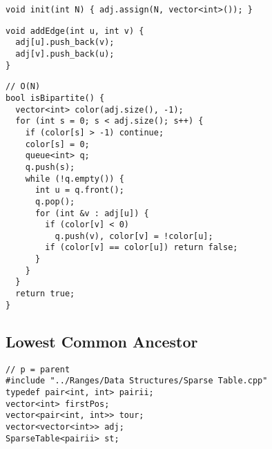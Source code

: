 \documentclass[twoside]{article}
\newcommand{\fileTitleStyle}{\large\underline}
\begin{document}
\begin{multicols*}{2}
\begin{verbatim}
void init(int N) { adj.assign(N, vector<int>()); }
\end{verbatim}
\vspace{-12pt}
\begin{verbatim}
void addEdge(int u, int v) {
  adj[u].push_back(v);
  adj[v].push_back(u);
}
\end{verbatim}
\vspace{-12pt}
\begin{verbatim}
// O(N)
bool isBipartite() {
  vector<int> color(adj.size(), -1);
  for (int s = 0; s < adj.size(); s++) {
    if (color[s] > -1) continue;
    color[s] = 0;
    queue<int> q;
    q.push(s);
    while (!q.empty()) {
      int u = q.front();
      q.pop();
      for (int &v : adj[u]) {
        if (color[v] < 0)
          q.push(v), color[v] = !color[u];
        if (color[v] == color[u]) return false;
      }
    }
  }
  return true;
}
\end{verbatim}

\subsectionfont{\centering\bfseries\LARGE}
\subsectionfont{\fileTitleStyle}
\subsection*{Lowest Common Ancestor}
\begin{verbatim}
// p = parent
#include "../Ranges/Data Structures/Sparse Table.cpp"
typedef pair<int, int> pairii;
vector<int> firstPos;
vector<pair<int, int>> tour;
vector<vector<int>> adj;
SparseTable<pairii> st;


\end{verbatim}
\end{multicols*}
\end{document}
